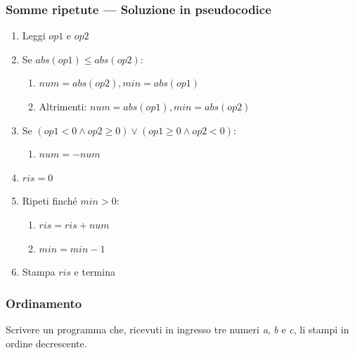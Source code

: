 \documentclass[aspectratio=169]{beamer}
\begin{document}
\begin{frame}
\frametitle{Somme ripetute --- Soluzione in pseudocodice}
\begin{enumerate}
	\item Leggi $op1$ e $op2$
	\item Se $abs(op1) \leq abs(op2)$:
	\begin{enumerate}
		\item $num=abs(op2), min=abs(op1)$
		\item Altrimenti: $num=abs(op1), min=abs(op2)$
	\end{enumerate}

	\item Se $(op1 < 0 \wedge op2 \geq 0) \vee (op1 \geq 0 \wedge op2 < 0)$:
	\begin{enumerate}%
		\item $num = -num$
	\end{enumerate}

	\item $ris = 0$
	\item Ripeti finché $min > 0$:
	\begin{enumerate}
		\item $ris = ris + num$
		\item $min = min - 1$
	\end{enumerate}
	\item Stampa $ris$ e termina
\end{enumerate}
\end{frame}

\iffalse
\begin{frame}
\frametitle{Ordinamento}
Scrivere un programma che, ricevuti in ingresso tre numeri \emph{a}, \emph{b} e \emph{c}, li stampi in ordine decrescente.
\end{frame}
\end{document}
